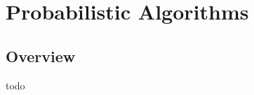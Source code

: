 


\chapter{Probabilistic Algorithms}
\label{ch:probabilistic}

\section{Overview}
todo

\newpage
\newpage
\newpage
\newpage
\newpage
